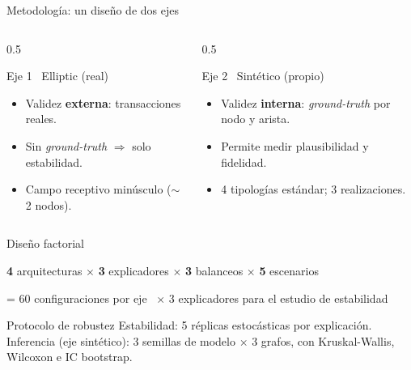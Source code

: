 \documentclass[aspectratio=169,10pt]{beamer}
\begin{document}
\begin{frame}{Metodología: un diseño de dos ejes}
\begin{columns}[T]
\begin{column}{0.5\textwidth}
\begin{block}{Eje 1 \textperiodcentered\ Elliptic (real)}
\begin{itemize}\small
  \item Validez \textbf{externa}: transacciones reales.
  \item Sin \textit{ground-truth} $\Rightarrow$ solo estabilidad.
  \item Campo receptivo minúsculo ($\sim$2 nodos).
\end{itemize}
\end{block}
\end{column}
\begin{column}{0.5\textwidth}
\begin{block}{Eje 2 \textperiodcentered\ Sintético (propio)}
\begin{itemize}\small
  \item Validez \textbf{interna}: \textit{ground-truth} por nodo y arista.
  \item Permite medir plausibilidad y fidelidad.
  \item 4 tipologías estándar; 3 realizaciones.
\end{itemize}
\end{block}
\end{column}
\end{columns}
\end{frame}

\begin{frame}{Diseño factorial}
\begin{center}
{\color{teal}\Large\textbf{4}} arquitecturas \; $\times$ \; {\color{amber}\Large\textbf{3}} explicadores \; $\times$ \; {\color{seafoam}\Large\textbf{3}} balanceos \; $\times$ \; {\color{coral}\Large\textbf{5}} escenarios
\end{center}
\vspace{2pt}
\begin{center}\small = 60 configuraciones por eje \, $\times$ 3 explicadores para el estudio de estabilidad\end{center}
\vspace{4pt}
\begin{block}{Protocolo de robustez}
\small Estabilidad: 5 réplicas estocásticas por explicación. Inferencia (eje sintético): 3 semillas de modelo $\times$ 3 grafos, con Kruskal-Wallis, Wilcoxon e IC bootstrap.
\end{block}
\end{frame}
\end{document}
